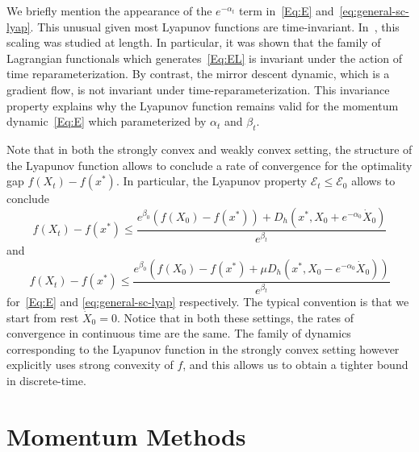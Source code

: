 \documentclass[11pt]{article}
\theoremstyle{plain}
\newcommand{\E}{{\mathcal E}}
\begin{document}
We briefly mention the appearance of the $e^{-\alpha_t}$ term in~\eqref{Eq:E} and~\eqref{eq:general-sc-lyap}. This unusual given most Lyapunov functions are time-invariant. In~\cite{Acceleration}, this scaling was studied at length. In particular, it was shown that the family of Lagrangian functionals which generates~\eqref{Eq:EL} is invariant under the action of time reparameterization. By contrast, the mirror descent dynamic, which is a gradient flow, is not invariant under time-reparameterization. %
This invariance property explains why the Lyapunov function remains valid for the momentum dynamic~\eqref{Eq:E} which parameterized by $\alpha_t$ and $\beta_t$. 


Note that in both the strongly convex and weakly convex setting, the structure of the Lyapunov function allows to conclude a rate of convergence for the optimality gap $f(X_t) - f(x^\ast)$. In particular, the Lyapunov property $\E_t \leq \E_0$ allows to conclude 
\begin{equation}\label{eq:Guarantee1}
f(X_t) - f(x^\ast) \leq \frac{e^{\beta_0}(f(X_0) - f(x^\ast)) + D_h(x^\ast, X_0 + e^{-\alpha_0} \dot X_0)}{e^{\beta_t}}
\end{equation}
and 
\begin{equation}
f(X_t) - f(x^\ast) \leq \frac{e^{\beta_0}(f(X_0) - f(x^\ast) +\mu D_h(x^\ast ,X_0 -e^{-\alpha_0} \dot X_0))}{e^{\beta_t}}
\end{equation}
for~\eqref{Eq:E} and \eqref{eq:general-sc-lyap} respectively. The typical convention is that we start from rest $\dot X_0 = 0$. Notice that in both these settings, the rates of convergence in continuous time are the same. The family of dynamics corresponding to the Lyapunov function in the strongly convex setting however explicitly uses strong convexity of $f$, and this allows us to obtain a tighter bound in discrete-time.


\section{Momentum Methods}
\label{Sec:MomLyap}
\end{document}
